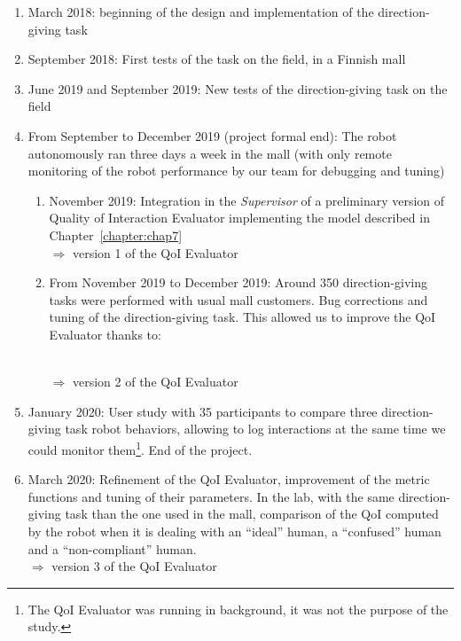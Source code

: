 \documentclass[a4paper,11pt,twoside]{StyleThese}
\begin{document}
\begin{enumerate}
	\item March 2018: beginning of the design and implementation of the direction-giving task
	\item September 2018: First tests of the task on the field, \ie in a Finnish mall
	\item June 2019 and September 2019: New tests of the direction-giving task on the field
	\item From September to December 2019 (project formal end): The robot autonomously ran three days a week in the mall (with only remote monitoring of the robot performance by our team for debugging and tuning)
	\begin{enumerate}
		\item November 2019: Integration in the \emph{Supervisor} of a preliminary version of Quality of Interaction Evaluator implementing the model described in Chapter~\ref{chapter:chap7} \\ $\Longrightarrow$ version 1 of the QoI Evaluator
		\item From November 2019 to December 2019: Around 350 direction-giving tasks were performed with usual mall customers. Bug corrections and tuning of the direction-giving task. This allowed us to improve the QoI Evaluator thanks to:  \\ $\Longrightarrow$ version 2 of the QoI Evaluator\label{list:mall}
	\end{enumerate}
	\item January 2020: User study with 35 participants to compare three direction-giving task robot behaviors, allowing to log interactions at the same time we could monitor them\footnote{The QoI Evaluator was running in background, it was not the purpose of the study.}. End of the project.\label{list:tests}
	\item March 2020: Refinement of the QoI Evaluator, \ie improvement of the metric functions and tuning of their parameters. In the lab, with the same direction-giving task than the one used in the mall, comparison of the QoI computed by the robot when it is dealing with an ``ideal'' human, a ``confused'' human and a ``non-compliant'' human. \\ $\Longrightarrow$ version 3 of the QoI Evaluator\label{list:refin}
\end{enumerate}
\end{document}

